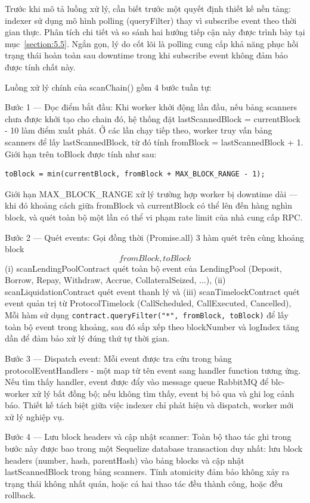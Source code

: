 \documentclass[../DoAn.tex]{subfiles}
\begin{document}
Trước khi mô tả luồng xử lý, cần biết trước một quyết định thiết kế nền tảng: indexer sử dụng mô hình polling (queryFilter) thay vì subscribe event theo thời gian thực. Phân tích chi tiết và so sánh hai hướng tiếp cận này được trình bày tại mục~\ref{section:5.5}. Ngắn gọn, lý do cốt lõi là polling cung cấp khả năng phục hồi trạng thái hoàn toàn sau downtime trong khi subscribe event không đảm bảo được tính chất này.

Luồng xử lý chính của scanChain() gồm 4 bước tuần tự:

Bước 1 --- Đọc điểm bắt đầu: Khi worker khởi động lần đầu, nếu bảng scanners chưa được khởi tạo cho chain đó, hệ thống đặt lastScannedBlock = currentBlock - 10 làm điểm xuất phát. Ở các lần chạy tiếp theo, worker truy vấn bảng scanners để lấy lastScannedBlock, từ đó tính fromBlock = lastScannedBlock + 1. Giới hạn trên toBlock được tính như sau:
\begin{lstlisting}
toBlock = min(currentBlock, fromBlock + MAX_BLOCK_RANGE - 1);
\end{lstlisting}


Giới hạn MAX\_BLOCK\_RANGE xử lý trường hợp worker bị downtime dài --- khi đó khoảng cách giữa fromBlock và currentBlock có thể lên đến hàng nghìn block, và quét toàn bộ một lần có thể vi phạm rate limit của nhà cung cấp RPC.

Bước 2 --- Quét events: Gọi đồng thời (Promise.all) 3 hàm quét trên cùng khoảng block \[fromBlock, toBlock\](i) scanLendingPoolContract quét toàn bộ event của LendingPool (Deposit, Borrow, Repay, Withdraw, Accrue, CollateralSeized, ...), (ii) scanLiquidationContract quét event thanh lý và (iii) scanTimelockContract quét event quản trị từ ProtocolTimelock (CallScheduled, CallExecuted, Cancelled), Mỗi hàm sử dụng \texttt{contract.queryFilter("*", fromBlock, toBlock)} để lấy toàn bộ event trong khoảng, sau đó sắp xếp theo blockNumber và logIndex tăng dần để đảm bảo xử lý đúng thứ tự thời gian.

Bước 3 --- Dispatch event: Mỗi event được tra cứu trong bảng protocolEventHandlers - một map từ tên event sang handler function tương ứng. Nếu tìm thấy handler, event được đẩy vào message queue RabbitMQ để blc-worker xử lý bất đồng bộ; nếu không tìm thấy, event bị bỏ qua và ghi log cảnh báo. Thiết kế tách biệt giữa việc indexer chỉ phát hiện và dispatch, worker mới xử lý nghiệp vụ.

Bước 4 --- Lưu block headers và cập nhật scanner: Toàn bộ thao tác ghi trong bước này được bao trong một Sequelize database transaction duy nhất: lưu block headers (number, hash, parentHash) vào bảng blocks và cập nhật lastScannedBlock trong bảng scanners. Tính atomicity đảm bảo không xảy ra trạng thái không nhất quán, hoặc cả hai thao tác đều thành công, hoặc đều rollback.
\end{document}
